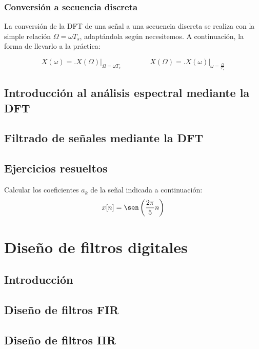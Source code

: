 \documentclass[a4paper,oneside]{book}
\begin{document}
\subsection{Conversión a secuencia discreta}

La conversión de la DFT de una señal a una secuencia discreta se realiza con la simple relación $\Omega = \omega T_s$, adaptándola según necesitemos. A continuación, la forma de llevarlo a la práctica:

\[ X \left( \omega \right) = \biggl. X \left( \Omega \right)  \biggr\vert _{\Omega = \omega T_s} \qquad \qquad X \left( \Omega \right) = \biggl. X \left( \omega \right)  \biggr\vert _{\omega = \frac{\Omega}{T_s}} \]

\section{Introducción al análisis espectral mediante la DFT}

\section{Filtrado de señales mediante la DFT}

\section{Ejercicios resueltos}


Calcular los coeficientes $a_k$ de la señal indicada a continuación: \[ x[n] = \sen \left( \frac{2\pi}{5}n \right) \]



\chapter{Diseño de filtros digitales} \label{temaDeFiltros}

\section{Introducción}

\section{Diseño de filtros FIR}

\section{Diseño de filtros IIR}
\end{document}
